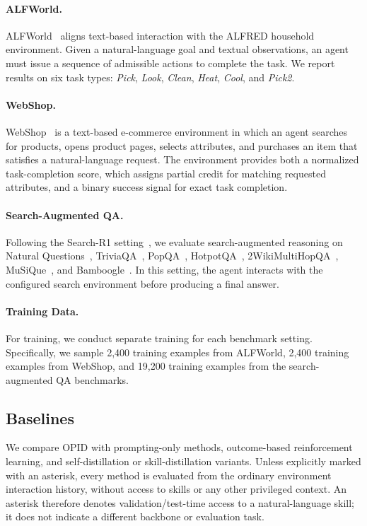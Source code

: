 \paragraph{ALFWorld.}
ALFWorld~\citep{shridhar2020alfworld} aligns text-based interaction with the ALFRED household environment. Given a natural-language goal and textual observations, an agent must issue a sequence of admissible actions to complete the task. We report results on six task types: \textit{Pick}, \textit{Look}, \textit{Clean}, \textit{Heat}, \textit{Cool}, and \textit{Pick2}.

\paragraph{WebShop.}
WebShop~\citep{yao2022webshop} is a text-based e-commerce environment in which an agent searches for products, opens product pages, selects attributes, and purchases an item that satisfies a natural-language request. The environment provides both a normalized task-completion score, which assigns partial credit for matching requested attributes, and a binary success signal for exact task completion.

\paragraph{Search-Augmented QA.}
Following the Search-R1 setting~\citep{jin2025searchr1}, we evaluate search-augmented reasoning on Natural Questions~\citep{kwiatkowski2019natural}, TriviaQA~\citep{joshi2017triviaqa}, PopQA~\citep{mallen2023popqa}, HotpotQA~\citep{yang2018hotpotqa}, 2WikiMultiHopQA~\citep{ho2020constructing}, MuSiQue~\citep{trivedi2022musique}, and Bamboogle~\citep{press2023measuring}. In this setting, the agent interacts with the configured search environment before producing a final answer.

\paragraph{Training Data.}
For training, we conduct separate training for each benchmark setting. Specifically, we sample 2,400 training examples from ALFWorld, 2,400 training examples from WebShop, and 19,200 training examples from the search-augmented QA benchmarks.

\subsection{Baselines}\label{app:baselines}
We compare OPID with prompting-only methods, outcome-based reinforcement learning, and self-distillation or skill-distillation variants. Unless explicitly marked with an asterisk, every method is evaluated from the ordinary environment interaction history, without access to skills or any other privileged context. An asterisk therefore denotes validation/test-time access to a natural-language skill; it does not indicate a different backbone or evaluation task.

